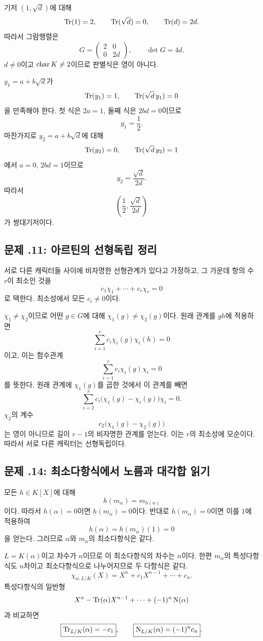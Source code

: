 \begin{solution}
기저 $(1,\sqrt d)$에 대해
\[
  \operatorname{Tr}(1)=2,\qquad
  \operatorname{Tr}(\sqrt d)=0,\qquad
  \operatorname{Tr}(d)=2d.
\]
따라서 그람행렬은
\[
  G=
  \begin{pmatrix}
    2&0\\
    0&2d
  \end{pmatrix},
\qquad
  \det G=4d.
\]
$d\ne0$이고 $\operatorname{char} K\ne2$이므로 판별식은 영이 아니다.

$y_1=a+b\sqrt d$가
\[
  \operatorname{Tr}(y_1)=1,\qquad
  \operatorname{Tr}(\sqrt d\,y_1)=0
\]
을 만족해야 한다. 첫 식은 $2a=1$, 둘째 식은 $2bd=0$이므로
\[
  y_1=\frac12.
\]
마찬가지로 $y_2=a+b\sqrt d$에 대해
\[
  \operatorname{Tr}(y_2)=0,\qquad
  \operatorname{Tr}(\sqrt d\,y_2)=1
\]
에서 $a=0$, $2bd=1$이므로
\[
  y_2=\frac{\sqrt d}{2d}.
\]
따라서
\[
  \boxed{
  \left(\frac12,\frac{\sqrt d}{2d}\right)}
\]
가 쌍대기저이다.
\end{solution}

\subsection*{문제 \thechapter.11: 아르틴의 선형독립 정리}

\begin{solution}
서로 다른 캐릭터들 사이에 비자명한 선형관계가 있다고 가정하고,
그 가운데 항의 수 $r$이 최소인 것을
\[
  c_1\chi_1+\cdots+c_r\chi_r=0
\]
로 택한다. 최소성에서 모든 $c_i\ne0$이다.

$\chi_1\ne\chi_2$이므로 어떤 $g\in G$에 대해
$\chi_1(g)\ne\chi_2(g)$이다. 원래 관계를 $gh$에 적용하면
\[
  \sum_{i=1}^r c_i\chi_i(g)\chi_i(h)=0
\]
이고, 이는 함수관계
\[
  \sum_{i=1}^r c_i\chi_i(g)\chi_i=0
\]
를 뜻한다. 원래 관계에 $\chi_1(g)$를 곱한 것에서 이 관계를 빼면
\[
  \sum_{i=2}^r
  c_i\bigl(\chi_1(g)-\chi_i(g)\bigr)\chi_i=0.
\]
$\chi_2$의 계수
\[
  c_2\bigl(\chi_1(g)-\chi_2(g)\bigr)
\]
는 영이 아니므로 길이 $r-1$의 비자명한 관계를 얻는다.
이는 $r$의 최소성에 모순이다. 따라서 서로 다른 캐릭터는 선형독립이다.
\end{solution}

\subsection*{문제 \thechapter.14: 최소다항식에서 노름과 대각합 읽기}

\begin{solution}
모든 $h\in K[X]$에 대해
\[
  h(m_\alpha)=m_{h(\alpha)}
\]
이다. 따라서 $h(\alpha)=0$이면 $h(m_\alpha)=0$이다.
반대로 $h(m_\alpha)=0$이면 이를 $1$에 적용하여
\[
  h(\alpha)=h(m_\alpha)(1)=0
\]
을 얻는다. 그러므로 $\alpha$와 $m_\alpha$의 최소다항식은 같다.

$L=K(\alpha)$이고 차수가 $n$이므로 이 최소다항식의 차수는 $n$이다.
한편 $m_\alpha$의 특성다항식도 $n$차이고 최소다항식으로 나누어지므로
두 다항식은 같다.
\[
  \chi_{\alpha,L/K}(X)
  =X^n+c_1X^{n-1}+\cdots+c_n.
\]
특성다항식의 일반형
\[
  X^n-\operatorname{Tr}(\alpha)X^{n-1}
  +\cdots+(-1)^n\operatorname{N}(\alpha)
\]
과 비교하면
\[
  \boxed{\operatorname{Tr}_{L/K}(\alpha)=-c_1},
  \qquad
  \boxed{\operatorname{N}_{L/K}(\alpha)=(-1)^nc_n}.
\]
\end{solution}

